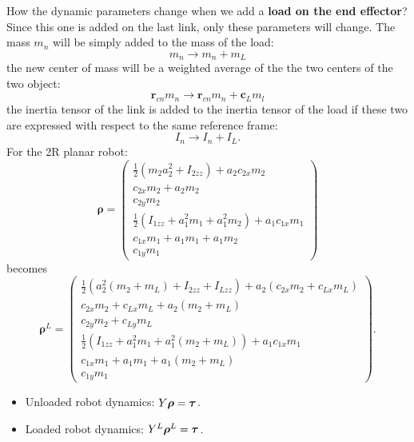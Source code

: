 \documentclass[10pt, a4paper]{report}
\begin{document}
\noindent How the dynamic parameters change when we add a \textbf{load on the end effector}? Since this one is added on the last link, only these parameters will change. The mass $m_n$ will be simply added to the mass of the load:\begin{equation}
    m_n\longrightarrow m_n+m_L
\end{equation}
the new center of mass will be a weighted average of the the two centers of the two object:\begin{equation}
    \mathbf r_{cn}m_n\longrightarrow \mathbf r_{cn}m_n+\mathbf c_Lm_l
\end{equation}
the inertia tensor of the link is added to the inertia tensor of the load if these two are expressed with respect to the same reference frame:\begin{equation}
    I_n\longrightarrow I_n+I_L.
\end{equation}
For the 2R planar robot:\begin{equation}
    \boldsymbol{\rho} = \begin{pmatrix}
\frac{1}{2} \left( m_2 a_2^2 + I_{2zz} \right) + a_2 c_{2x} m_2 \\
c_{2x} m_2 + a_2 m_2 \\
c_{2y} m_2 \\
\frac{1}{2} \left( I_{1zz} + a_1^2 m_1 + a_1^2 m_2 \right) + a_1 c_{1x} m_1 \\
c_{1x} m_1 + a_1 m_1 + a_1 m_2 \\
c_{1y} m_1
\end{pmatrix}\end{equation}becomes\begin{equation}\boldsymbol{\rho}^L = \begin{pmatrix}
\frac{1}{2} \left( a_2^2 (m_2 + m_L) + I_{2zz} + I_{Lzz} \right) + a_2 (c_{2x} m_2 + c_{Lx} m_L) \\
c_{2x} m_2 + c_{Lx} m_L + a_2 (m_2 + m_L) \\
c_{2y} m_2 + c_{Ly} m_L \\
\frac{1}{2} \left( I_{1zz} + a_1^2 m_1 + a_1^2 (m_2 + m_L) \right) + a_1 c_{1x} m_1 \\
c_{1x} m_1 + a_1 m_1 + a_1 (m_2 + m_L) \\
c_{1y} m_1
\end{pmatrix}.
\end{equation}\begin{itemize}
    \item Unloaded robot dynamics: $Y{\boldsymbol{\rho}}={\boldsymbol{\tau}}$.
    \item Loaded robot dynamics: $Y^L{\boldsymbol{\rho}}^L={\boldsymbol{\tau}}$.
\end{itemize}
\end{document}
